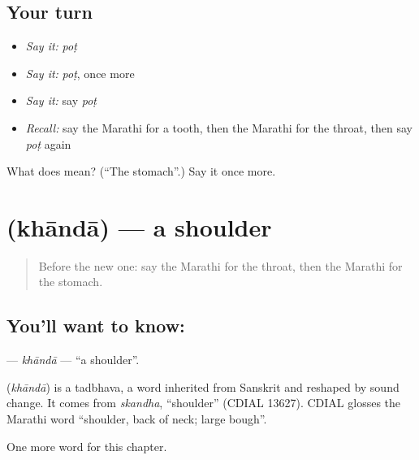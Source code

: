 \subsection*{Your turn}
\begin{itemize}
\raggedright
  \item \emph{Say it:} \emph{poṭ}
  \item \emph{Say it:} \emph{poṭ}, once more
  \item \emph{Say it:} say \emph{poṭ}
  \item \emph{Recall:} say the Marathi for a tooth, then the Marathi for the throat, then say \emph{poṭ} again
\end{itemize}

\begin{tcolorbox}[breakable,colback=teal!4,colframe=teal!35!black,title={Before you move on}]
What does  mean? (\textquotedblleft{}The stomach\textquotedblright{}.) Say it once more.
\end{tcolorbox}
\section[\texorpdfstring{\mr{खांदा} (khāndā)}{खांदा (khāndā)}]{ (khāndā) — a shoulder}

\label{lesson:MR-C71-khanda}



\begin{quote}
Before the new one: say the Marathi for the throat, then the Marathi for the stomach.
\end{quote}

\subsection*{You'll want to know: }
\textbf{} — \emph{khāndā} — \textquotedblleft{}a shoulder\textquotedblright{}.

\begin{cousinweb}
\textbf{} (\emph{khāndā}) is a tadbhava, a word inherited from Sanskrit and reshaped by sound change. It comes from \emph{skandha}, \textquotedblleft{}shoulder\textquotedblright{} (CDIAL 13627). CDIAL glosses the Marathi word \textquotedblleft{}shoulder, back of neck; large bough\textquotedblright{}.
\end{cousinweb}

\begin{grammarlens}[title={What you've built}]
One more word for this chapter.
\end{grammarlens}

